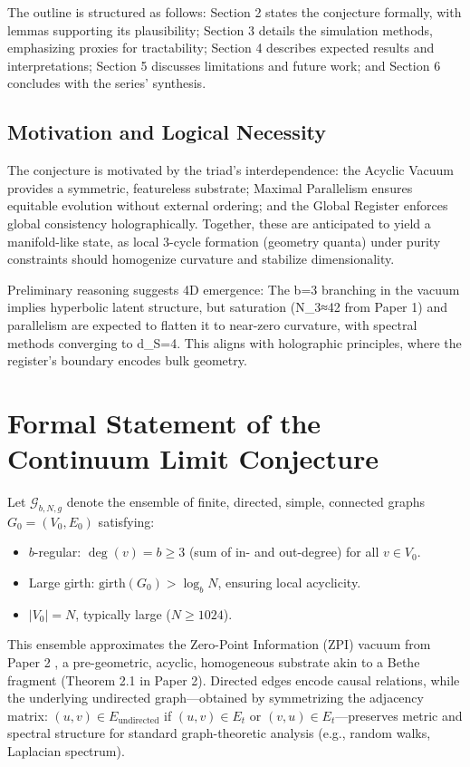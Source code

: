 \documentclass[11pt, a4paper]{article}
\begin{document}
The outline is structured as follows: Section 2 states the conjecture formally, with lemmas supporting its plausibility; Section 3 details the simulation methods, emphasizing proxies for tractability; Section 4 describes expected results and interpretations; Section 5 discusses limitations and future work; and Section 6 concludes with the series' synthesis.

\subsection{Motivation and Logical Necessity}
The conjecture is motivated by the triad's interdependence: the Acyclic Vacuum provides a symmetric, featureless substrate; Maximal Parallelism ensures equitable evolution without external ordering; and the Global Register enforces global consistency holographically. Together, these are anticipated to yield a manifold-like state, as local 3-cycle formation (geometry quanta) under purity constraints should homogenize curvature and stabilize dimensionality.

Preliminary reasoning suggests 4D emergence: The b=3 branching in the vacuum implies hyperbolic latent structure, but saturation (N_3≈42 from Paper 1) and parallelism are expected to flatten it to near-zero curvature, with spectral methods converging to d_S=4. This aligns with holographic principles, where the register's boundary encodes bulk geometry.

\section{Formal Statement of the Continuum Limit Conjecture}

Let \(\mathcal{G}_{b,N,g}\) denote the ensemble of finite, directed, simple, connected graphs \(G_0 = (V_0, E_0)\) satisfying:
\begin{itemize}
  \item \(b\)-regular: \(\deg(v) = b \geq 3\) (sum of in- and out-degree) for all \(v \in V_0\).
  \item Large girth: \(\text{girth}(G_0) > \log_b N\), ensuring local acyclicity.
  \item \(|V_0| = N\), typically large (\(N \geq 1024\)).
\end{itemize}
This ensemble approximates the Zero-Point Information (ZPI) vacuum from Paper 2 \cite{fisher2025triad}, a pre-geometric, acyclic, homogeneous substrate akin to a Bethe fragment (Theorem 2.1 in Paper 2). Directed edges encode causal relations, while the underlying undirected graph—obtained by symmetrizing the adjacency matrix: \((u,v) \in E_{\text{undirected}}\) if \((u,v) \in E_t\) or \((v,u) \in E_t\)—preserves metric and spectral structure for standard graph-theoretic analysis (e.g., random walks, Laplacian spectrum).
\end{document}
